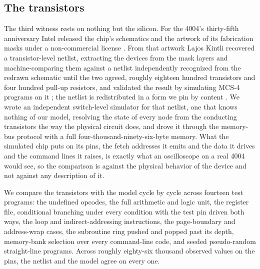 \documentclass[11pt]{amsart}
\theoremstyle{plain}
\theoremstyle{definition}
\begin{document}
\subsection{The transistors}

The third witness rests on nothing but the silicon. For the 4004's thirty-fifth anniversary Intel released the chip's schematics and the artwork of its fabrication masks under a non-commercial license \cite{masks}. From that artwork Lajos Kintli recovered a transistor-level netlist, extracting the devices from the mask layers and machine-comparing them against a netlist independently recognized from the redrawn schematic until the two agreed, roughly eighteen hundred transistors and four hundred pull-up resistors, and validated the result by simulating MCS-4 programs on it \cite{kintli}; the netlist is redistributed in a form we pin by content \cite{monta}. We wrote an independent switch-level simulator for that netlist, one that knows nothing of our model, resolving the state of every node from the conducting transistors the way the physical circuit does, and drove it through the memory-bus protocol with a full four-thousand-ninety-six-byte memory. What the simulated chip puts on its pins, the fetch addresses it emits and the data it drives and the command lines it raises, is exactly what an oscilloscope on a real 4004 would see, so the comparison is against the physical behavior of the device and not against any description of it.

We compare the transistors with the model cycle by cycle across fourteen test programs: the undefined opcodes, the full arithmetic and logic unit, the register file, conditional branching under every condition with the test pin driven both ways, the loop and indirect-addressing instructions, the page-boundary and address-wrap cases, the subroutine ring pushed and popped past its depth, memory-bank selection over every command-line code, and seeded pseudo-random straight-line programs. Across roughly eighty-six thousand observed values on the pins, the netlist and the model agree on every one.
\end{document}
